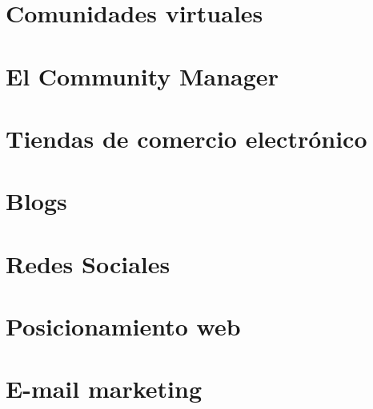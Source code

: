 \documentclass[12pt,fleqn]{book}
\begin{document}


\part{Comunidades virtuales}




\part{El Community Manager}



\part{Tiendas de comercio electrónico}



\part{Blogs}



\part{Redes Sociales}








\part{Posicionamiento web}



\part{E-mail marketing}


\end{document}
